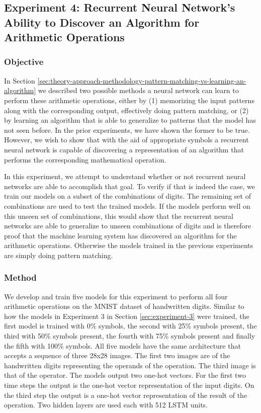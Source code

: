 \subsection{Experiment 4: Recurrent Neural Network's Ability to Discover an Algorithm for Arithmetic Operations} \label{sec:experiment-4}

\subsubsection{Objective}

In Section \ref{sec:theory-approach-methodology-pattern-matching-vs-learning-an-algorithm} we described two possible methods a neural network can learn to perform these arithmetic operations, either by (1) memorizing the input patterns along with the corresponding output, effectively doing pattern matching, or (2) by learning an algorithm that is able to generalize to patterns that the model has not seen before. In the prior experiments, we have shown the former to be true. However, we wish to show that with the aid of appropriate symbols a recurrent neural network is capable of discovering a representation of an algorithm that performs the corresponding mathematical operation.

In this experiment, we attempt to understand whether or not recurrent neural networks are able to accomplish that goal. To verify if that is indeed the case, we train our models on a subset of the combinations of digits. The remaining set of combinations are used to test the trained models. If the models perform well on this unseen set of combinations, this would show that the recurrent neural networks are able to generalize to unseen combinations of digits and is therefore proof that the machine learning system has discovered an algorithm for the arithmetic operations. Otherwise the models trained in the previous experiments are simply doing pattern matching.

\subsubsection{Method}

We develop and train five models for this experiment to perform all four arithmetic operations on the MNIST dataset of handwritten digits. Similar to how the models in Experiment 3 in Section \ref{sec:experiment-3} were trained,  the first model is trained with 0\% symbols, the second with 25\% symbols present, the third with 50\% symbols present, the fourth with 75\% symbols present and finally the fifth with 100\% symbols. All five models have the same architecture that accepts a sequence of three 28x28 images. The first two images are of the handwritten digits representing the operands of the operation. The third image is that of the operator. The models output two one-hot vectors. For the first two time steps the output is the one-hot vector representation of the input digits. On the third step the output is a one-hot vector representation of the result of the operation. Two hidden layers are used each with 512 LSTM units.

